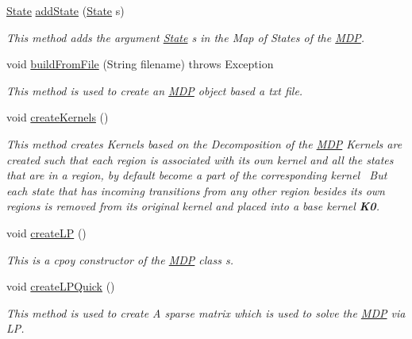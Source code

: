 \begin{DoxyCompactItemize}
\hyperlink{classmdp_1_1core_1_1_state}{State} \hyperlink{classmdp_1_1core_1_1_m_d_p_a0956e730497b8c93b09675990a75f283}{add\+State} (\hyperlink{classmdp_1_1core_1_1_state}{State} s)
\begin{DoxyCompactList}\small\item\em This method adds the argument \hyperlink{classmdp_1_1core_1_1_state}{State} s in the Map of States of the \hyperlink{classmdp_1_1core_1_1_m_d_p}{M\+D\+P}. \end{DoxyCompactList}\item 
void \hyperlink{classmdp_1_1core_1_1_m_d_p_a0565cd0a84c836dd11ba0d13e1eb5ffb}{build\+From\+File} (String filename)  throws Exception 	
\begin{DoxyCompactList}\small\item\em This method is used to create an \hyperlink{classmdp_1_1core_1_1_m_d_p}{M\+D\+P} object based a txt file. \end{DoxyCompactList}\item 
void \hyperlink{classmdp_1_1core_1_1_m_d_p_aa3d7c9f10aff03c993322d3ff7129dfb}{create\+Kernels} ()
\begin{DoxyCompactList}\small\item\em This method creates Kernels based on the Decomposition of the \hyperlink{classmdp_1_1core_1_1_m_d_p}{M\+D\+P} Kernels are created such that each region is associated with its own kernel and all the states that are in a region, by default become a part of the corresponding kernel~\newline
 But each state that has incoming transitions from any other region besides its own regions is removed from its original kernel and placed into a base kernel {\bfseries K0}.~\newline
 \end{DoxyCompactList}\item 
void \hyperlink{classmdp_1_1core_1_1_m_d_p_ab2c6f9846cf9362a472f66e1c7fe4117}{create\+L\+P} ()
\begin{DoxyCompactList}\small\item\em This is a cpoy constructor of the \hyperlink{classmdp_1_1core_1_1_m_d_p}{M\+D\+P} class s. \end{DoxyCompactList}\item 
void \hyperlink{classmdp_1_1core_1_1_m_d_p_aa964b87d7f54679adc323141cd99bebc}{create\+L\+P\+Quick} ()
\begin{DoxyCompactList}\small\item\em This method is used to create A sparse matrix which is used to solve the \hyperlink{classmdp_1_1core_1_1_m_d_p}{M\+D\+P} via L\+P. \end{DoxyCompactList}\item 

\end{DoxyCompactItemize}
